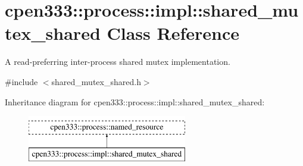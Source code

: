 \hypertarget{classcpen333_1_1process_1_1impl_1_1shared__mutex__shared}{}\section{cpen333\+:\+:process\+:\+:impl\+:\+:shared\+\_\+mutex\+\_\+shared Class Reference}
\label{classcpen333_1_1process_1_1impl_1_1shared__mutex__shared}


A read-\/preferring inter-\/process shared mutex implementation.  




{\ttfamily \#include $<$shared\+\_\+mutex\+\_\+shared.\+h$>$}

Inheritance diagram for cpen333\+:\+:process\+:\+:impl\+:\+:shared\+\_\+mutex\+\_\+shared\+:\begin{figure}[H]
\begin{center}
\leavevmode
\includegraphics[height=2.000000cm]{classcpen333_1_1process_1_1impl_1_1shared__mutex__shared}
\end{center}
\end{figure}
